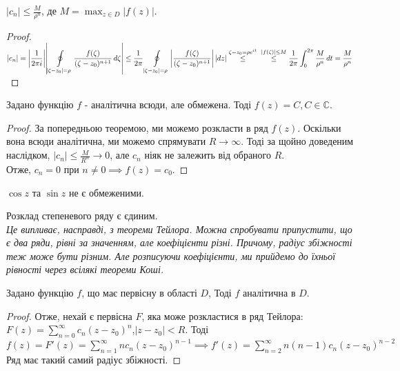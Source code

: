 \documentclass{math_library}
\begin{document}
\begin{corollary}
$\displaystyle |c_n| \leq \frac{M}{\rho^n}$, де $\displaystyle M=\max_{z\in D} |f(z)|$.
\end{corollary}

\begin{proof}
	 $\displaystyle |c_n| = \abs{\frac{1}{2\pi i}} \abs{\oint\displaylimits_{|\zeta-z_0|=\rho} \frac{f(\zeta)}{(\zeta-z_0)^{n+1}}\,d\zeta} \leq \frac{1}{2\pi} \oint\displaylimits_{|\zeta-z_0|=\rho} \abs{\frac{f(\zeta)}{(\zeta-z_0)^{n+1}}}\,\abs{dz} \overset{\zeta-z_0= \rho e^{it}}{\leq} \\ \overset{|f(\zeta)| \leq M}{\leq} \frac{1}{2\pi} \int_{0}^{2 \pi} \frac{M}{\rho^n}\,dt = \frac{M}{\rho^n}$
\end{proof}

\begin{theorem}
Задано функцію $f$ - аналітична всюди, але обмежена. Тоді $f(z)=C, C \in \mathbb{C}$.
\end{theorem}

\begin{proof}
За попередньою теоремою, ми можемо розкласти в ряд $f(z)$. Оскільки вона всюди аналітична, ми можемо спрямувати $R \to \infty$. Тоді за щойно доведеним наслідком, $\displaystyle |c_n| \leq \frac{M}{R^n} \rightarrow 0$, але $c_n$ ніяк не залежить від обраного $R$.\\
Отже, $c_n=0$ при $n \neq 0 \implies f(z)=c_0$.
\end{proof}

\begin{corollary}
$\cos z$ та $\sin z$ не є обмеженими.
\end{corollary}

\begin{theorem}
Розклад степеневого ряду є єдиним.\\
\textit{Це випливає, насправді, з теореми Тейлора. Можна спробувати припустити, що є два ряди, рівні за значенням, але коефіцієнти різні. Причому, радіус збіжності теж може бути різним. Але розписуючи коефіцієнти, ми прийдемо до їхньої рівності через всілякі теореми Коші.}
\end{theorem}

\begin{proposition}
Задано функцію $f$, що має первісну в області $D$, Тоді $f$ аналітична в $D$.
\end{proposition}

\begin{proof}
Отже, нехай є первісна $F$, яка може розкластися в ряд Тейлора:\\
$\displaystyle F(z)=\sum_{n=0}^{\infty} c_n(z-z_0)^n$,$|z-z_0|<R$. Тоді\\ $\displaystyle f(z)=F'(z)=\sum_{n=1}^{\infty} nc_n(z-z_0)^{n-1} \implies f'(z) = \sum_{n=2}^{\infty} n(n-1)c_n(z-z_0)^{n-2}$\\
Ряд має такий самий радіус збіжності.
\end{proof}
\end{document}
